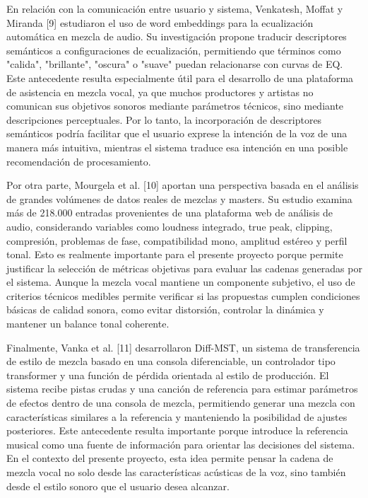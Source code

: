 En relación con la comunicación entre usuario y sistema, Venkatesh, Moffat y Miranda [9] estudiaron el uso de word embeddings para la ecualización automática en mezcla de audio. Su investigación propone traducir descriptores semánticos a configuraciones de ecualización, permitiendo que términos como "calida", "brillante", "oscura" o "suave" puedan relacionarse con curvas de EQ. Este antecedente resulta especialmente útil para el desarrollo de una plataforma de asistencia en mezcla vocal, ya que muchos productores y artistas no comunican sus objetivos sonoros mediante parámetros técnicos, sino mediante descripciones perceptuales. Por lo tanto, la incorporación de descriptores semánticos podría facilitar que el usuario exprese la intención de la voz de una manera más intuitiva, mientras el sistema traduce esa intención en una posible recomendación de procesamiento.

Por otra parte, Mourgela et al. [10] aportan una perspectiva basada en el análisis de grandes volúmenes de datos reales de mezclas y masters. Su estudio examina más de 218.000 entradas provenientes de una plataforma web de análisis de audio, considerando variables como loudness integrado, true peak, clipping, compresión, problemas de fase, compatibilidad mono, amplitud estéreo y perfil tonal. Esto es realmente importante para el presente proyecto porque permite justificar la selección de métricas objetivas para evaluar las cadenas generadas por el sistema. Aunque la mezcla vocal mantiene un componente subjetivo, el uso de criterios técnicos medibles permite verificar si las propuestas cumplen condiciones básicas de calidad sonora, como evitar distorsión, controlar la dinámica y mantener un balance tonal coherente.

Finalmente, Vanka et al. [11] desarrollaron Diff-MST, un sistema de transferencia de estilo de mezcla basado en una consola diferenciable, un controlador tipo transformer y una función de pérdida orientada al estilo de producción. El sistema recibe pistas crudas y una canción de referencia para estimar parámetros de efectos dentro de una consola de mezcla, permitiendo generar una mezcla con características similares a la referencia y manteniendo la posibilidad de ajustes posteriores. Este antecedente resulta importante porque introduce la referencia musical como una fuente de información para orientar las decisiones del sistema. En el contexto del presente proyecto, esta idea permite pensar la cadena de mezcla vocal no solo desde las características acústicas de la voz, sino también desde el estilo sonoro que el usuario desea alcanzar.


